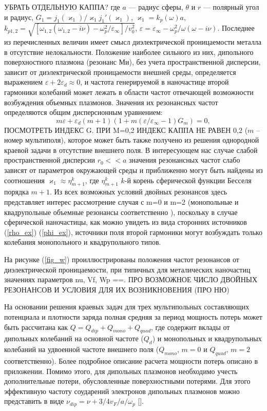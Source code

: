 \documentclass[12pt, a4paper]{article}
\def \eps {\varepsilon}
\def \w {\omega}
\def \kp { \varkappa}
\begin{document}
УБРАТЬ ОТДЕЛЬНУЮ КАППА?
где $a$ — радиус сферы, $\theta$ и $r$  — полярный угол и радиус, $G_1 ={j_1(\kp_1)}/{\kp_1 j_1'(\kp_1)}$, $\kp_1= k_p(\omega)a$, $k_{p1,2} = \sqrt{[\w_{1,2}(\w_{1,2} - i\nu) - \w_p^2/\eps_\infty]/v_0^2} $, $\eps = \eps_\infty - {\w_p^2}/{\w(\w - i\nu)}$. Последнее из перечисленных величин имеет смысл диэлектрической проницаемости металла в отсутствие нелокальности. 
Положение наиболее сильного из них, дипольного поверхностного плазмона (резонанс Ми), без учета пространственной дисперсии, зависит от диэлектрической проницаемости внешней среды, определяется выражением $ \eps + 2\eps_d \approx 0$, и частота генерируемой в наночастице второй гармоники колебаний может лежать в области частот отвечающей возможности возбуждения объемных плазмонов. Значения их резонансных частот определяются общим дисперсионным уравнением:
\begin{equation} 	
m \eps + \eps_d(m+1)(1 + m (\eps/\eps_\infty - 1) G_m) = 0,	
\end{equation}
ПОСМОТРЕТЬ ИНДЕКС G. ПРИ M=0,2 ИНДЕКС КАППА НЕ РАВЕН 0,2
($m$ – номер мультиполя), которое может быть также получено из решения однородной краевой задачи в отсутствие внешнего поля. В интересующем нас случае слабой пространственной дисперсии $r_0 << a$ значения резонансных частот слабо зависят от параметров окружающей среды и приближенно могут быть найдены из соотношения $ \kp_1 \approx \eta_{m+1}^k$, где $\eta_{m+1}^k$ $k$-й корень сферической функции Бесселя порядка $m+1$.	Из всех возможных условий двойных резонансов здесь представляет интерес рассмотрение случая с m=0 и m=2 (монопольные и квадрупольные объемные резонансы соответственно ), поскольку в случае сферической наночастицы, как можно увидеть из вида сторонних источников (\ref{rho_ex}) (\ref{phi_ex}), источники поля второй гармоники могут возбуждать только колебания монопольного и квадрупольного типов. 

На рисунке (\ref{fig_w}) проиллюстрированы положения частот резонансов от диэлектрической проницаемости, при типичных для металических наночастиц значениях параметров nu, Vf, Wp ==. ПРО ВОЗМОЖНОЕ ЧИСЛО ДВОЙНЫХ РЕЗОНАНСОВ И УСЛОВИЯ ДЛЯ ИХ ВОЗНИКНОВЕНИЯ (ПРО НЮ)

На основании решения краевых задач для трех мультипольных составляющих потенциала и плотности заряда полная средняя за период мощность потерь может быть рассчитана как $Q = Q_{dip} + Q_{mono} + Q_{quad}$, где  содержит вклады от дипольных колебаний на основной частоте ($Q_d$) и монопольных и квадрупольных колебаний на удвоенной частоте внешнего поля ($Q_{mono}$, $m=0$ и $Q_{quad}$, $m=2$ соответственно). Более подробное описание расчета мощности потерь описано в приложении. Помимо этого, для дипольных плазмонов необходимо учесть дополнительные потери, обусловленные поверхностными потерями. Для этого эффективную частоту соударений электронов дипольных плазмонов можно представить в виде $\nu_{dip} = \nu + 3/4 v_F / a / \w_p$ [].
\end{document}
